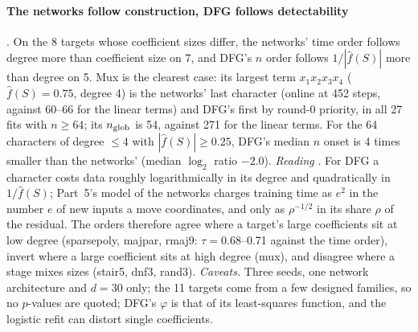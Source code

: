 \paragraph{The networks follow construction, DFG follows detectability} . On the 8 targets whose coefficient sizes differ, the networks' time order follows degree more than coefficient size on 7, and DFG's $n$ order follows $1/|\hat f(S)|$ more than degree on 5. Mux is the clearest case: its largest term $x_1x_2x_3x_4$ ($\hat f(S)=0.75$, degree 4) is the networks' last character (online at 452 steps, against 60--66 for the linear terms) and DFG's first by round-0 priority, in all 27 fits with $n\ge64$; its $n_{\rm glob}$ is 54, against 271 for the linear terms. For the 64 characters of degree $\le4$ with $|\hat f(S)|\ge0.25$, DFG's median $n$ onset is 4 times smaller than the networks' (median $\log_2$ ratio $-2.0$). \emph{Reading} . For DFG a character costs data roughly logarithmically in its degree and quadratically in $1/\hat f(S)$; Part~5's model of the networks charges training time as $e^2$ in the number $e$ of new inputs a move coordinates, and only as $\rho^{-1/2}$ in its share $\rho$ of the residual. The orders therefore agree where a target's large coefficients sit at low degree (sparsepoly, majpar, rmaj9: $\tau=0.68$--0.71 against the time order), invert where a large coefficient sits at high degree (mux), and disagree where a stage mixes sizes (stair5, dnf3, rand3). \emph{Caveats.} Three seeds, one network architecture and $d=30$ only; the 11 targets come from a few designed families, so no $p$-values are quoted; DFG's $\varphi$ is that of its least-squares function, and the logistic refit can distort single coefficients.
